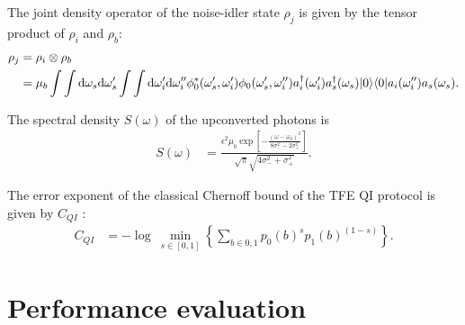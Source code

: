 \documentclass[../../note.tex]{subfiles}
\begin{document}
\begin{lemma}
    The joint density operator of the noise-idler state $\rho_j$ is given by the tensor product of $\rho_i$ and $\rho_b$:
    \begin{align}
        \rho_j 
        &= \rho_i \otimes \rho_b \\
        &= \mu_b \int \int {\rm d}\omega_s{\rm d}\omega_s' \int \int {\rm d}\omega_i'{\rm d}\omega_i''\phi_0^\ast(\omega_s', \omega_i') \phi_0(\omega_s', \omega_i'') a_i^\dagger(\omega_i') a_s^\dagger(\omega_s)\vert 0 \rangle \langle 0 \vert a_i(\omega_i'')a_s(\omega_s).
    \end{align}
\end{lemma}

\begin{lemma}
    The spectral density $S(\omega)$ of the upconverted photons is
    \begin{align}
        S(\omega)
        &= \frac{\epsilon^2 \mu_b \exp\left[-\frac{(\omega - \omega_0)^2}{8 \sigma_-^2 - 2 \sigma_+^2}\right]}{\sqrt{\pi} \sqrt{4 \sigma_-^2 + \sigma_+^2}}.
    \end{align}
\end{lemma}

\begin{theorem}
    The error exponent of the classical Chernoff bound of the TFE QI protocol is given by $C_{QI}$ \cite{nussbaum2009chernoff}:
    \begin{align}
        C_{QI}
        &= -\log~\min_{s \in [0,1]} \left\{\sum_{b \in 0,1}p_0(b)^s p_1(b)^{(1-s)}\right\}.
    \end{align}
\end{theorem}

\section{Performance evaluation}

\begin{lemma}
    \begin{align}
    \end{align}
\end{lemma}


%
%
\end{document}
